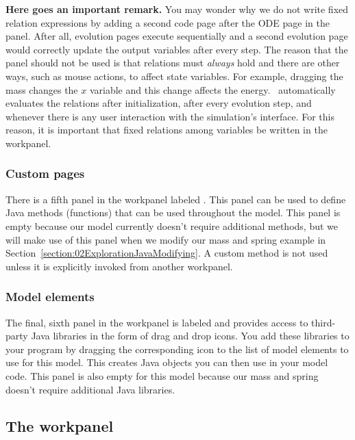 \noindent \textbf{Here goes an important remark.} You may wonder why we do not write fixed relation expressions by adding a second code page after the ODE page in the
 panel. After all, evolution pages execute sequentially and a second evolution page would correctly
update the output variables after every step. The reason that the  panel should not be used is that
relations must \emph{always} hold and there are other ways, such as mouse actions, to affect state
variables. For example, dragging the mass changes the $x$ variable and this change affects the energy.
\ejs\ automatically evaluates the relations after initialization, after every evolution step, and whenever
there is any user interaction with the simulation's interface.  For this reason, it is important that fixed relations among variables be written in the  workpanel.

\subsubsection{Custom pages}

There is a fifth panel in the  workpanel labeled . This panel can be used to define Java methods (functions) that can be used throughout the model.  This panel is empty because our model currently doesn't require additional methods,
but we will make use of this panel when we modify our mass and spring example in Section~\ref{section:02ExplorationJavaModifying}.  A
custom method is not used unless it is explicitly invoked from another workpanel.

\subsubsection{Model elements}

The final, sixth panel in the  workpanel is labeled  and provides access to third-party Java libraries in the form of drag and drop icons. You add these libraries to your program by dragging the corresponding icon to the list of model elements to use for this model. This creates Java objects you can then use in your model code. This panel is also empty for this model because our mass and spring doesn't require additional Java libraries.

\subsection{The  workpanel}

